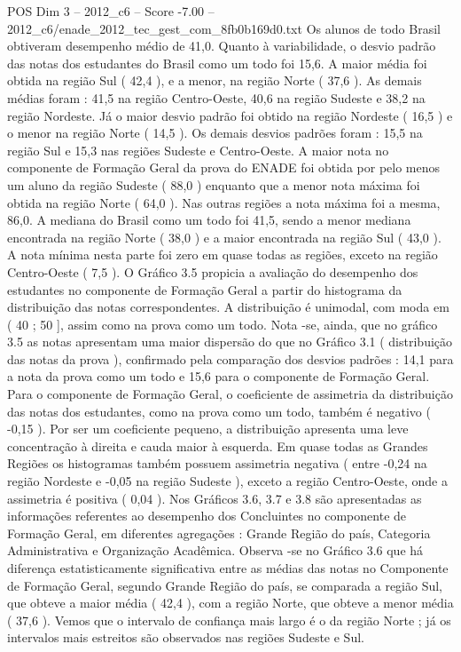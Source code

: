 \begin{textsample}{POS Dim 3 – 2012\_c6 – Score -7.00 – 2012\_c6/enade\_2012\_tec\_gest\_com\_8fb0b169d0.txt}
Os alunos de todo Brasil obtiveram desempenho médio de 41,0.
Quanto à variabilidade, o desvio padrão das notas dos estudantes do Brasil como um todo foi 15,6.
A maior média foi obtida na região Sul ( 42,4 ), e a menor, na região Norte ( 37,6 ).
As demais médias foram : 41,5 na região Centro-Oeste, 40,6 na região Sudeste e 38,2 na região Nordeste.
Já o maior desvio padrão foi obtido na região Nordeste ( 16,5 ) e o menor na região Norte ( 14,5 ).
Os demais desvios padrões foram : 15,5 na região Sul e 15,3 nas regiões Sudeste e Centro-Oeste.
A maior nota no componente de Formação Geral da prova do ENADE foi obtida por pelo menos um aluno da região Sudeste ( 88,0 ) enquanto que a menor nota máxima foi obtida na região Norte ( 64,0 ).
Nas outras regiões a nota máxima foi a mesma, 86,0.
A mediana do Brasil como um todo foi 41,5, sendo a menor mediana encontrada na região Norte ( 38,0 ) e a maior encontrada na região Sul ( 43,0 ).
A nota mínima nesta parte foi zero em quase todas as regiões, exceto na região Centro-Oeste ( 7,5 ).
O Gráfico 3.5 propicia a avaliação do desempenho dos estudantes no componente de Formação Geral a partir do histograma da distribuição das notas correspondentes.
A distribuição é unimodal, com moda em ( 40 ; 50 ], assim como na prova como um todo.
Nota -se, ainda, que no gráfico 3.5 as notas apresentam uma maior dispersão do que no Gráfico 3.1 ( distribuição das notas da prova ), confirmado pela comparação dos desvios padrões : 14,1 para a nota da prova como um todo e 15,6 para o componente de Formação Geral.
Para o componente de Formação Geral, o coeficiente de assimetria da distribuição das notas dos estudantes, como na prova como um todo, também é negativo ( -0,15 ).
Por ser um coeficiente pequeno, a distribuição apresenta uma leve concentração à direita e cauda maior à esquerda.
Em quase todas as Grandes Regiões os histogramas também possuem assimetria negativa ( entre -0,24 na região Nordeste e -0,05 na região Sudeste ), exceto a região Centro-Oeste, onde a assimetria é positiva ( 0,04 ).
Nos Gráficos 3.6, 3.7 e 3.8 são apresentadas as informações referentes ao desempenho dos Concluintes no componente de Formação Geral, em diferentes agregações : Grande Região do país, Categoria Administrativa e Organização Acadêmica.
Observa -se no Gráfico 3.6 que há diferença estatisticamente significativa entre as médias das notas no Componente de Formação Geral, segundo Grande Região do país, se comparada a região Sul, que obteve a maior média ( 42,4 ), com a região Norte, que obteve a menor média ( 37,6 ).
Vemos que o intervalo de confiança mais largo é o da região Norte ; já os intervalos mais estreitos são observados nas regiões Sudeste e Sul.

\end{textsample}
